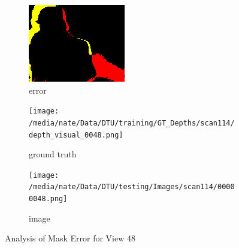 \documentclass{article}
\begin{document}
\begin{figure}
\begin{subfigure}{0.3\textwidth}
		\includegraphics[width=\textwidth]{./output/048_error.png}
		\caption{error}
		\label{fig:error48}
	\end{subfigure}
	\hfill
	\centering
	\begin{subfigure}{0.3\textwidth}
		\centering
		\texttt{[image: /media/nate/Data/DTU/training/GT\_Depths/scan114/depth\_visual\_0048.png]}
		\caption{ground truth}
		\label{fig:gt48}
	\end{subfigure}
	\hfill
	\centering
	\begin{subfigure}{0.3\textwidth}
		\centering
		\texttt{[image: /media/nate/Data/DTU/testing/Images/scan114/00000048.png]}
		\caption{image}
		\label{fig:img48}
	\end{subfigure}
	\hfill
	\caption{Analysis of Mask Error for View 48}
	\label{fig:error_analys48}
\end{figure}
\end{document}
